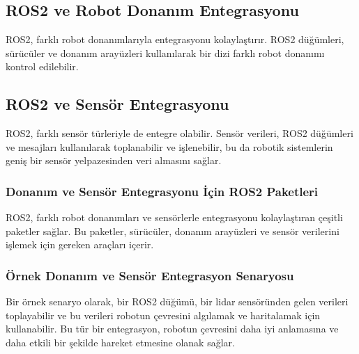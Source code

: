 \subsection{ROS2 ve Robot Donanım Entegrasyonu}
ROS2, farklı robot donanımlarıyla entegrasyonu kolaylaştırır. ROS2 düğümleri, sürücüler ve donanım arayüzleri kullanılarak bir dizi farklı robot donanımı kontrol edilebilir.

\subsection{ROS2 ve Sensör Entegrasyonu}
ROS2, farklı sensör türleriyle de entegre olabilir. Sensör verileri, ROS2 düğümleri ve mesajları kullanılarak toplanabilir ve işlenebilir, bu da robotik sistemlerin geniş bir sensör yelpazesinden veri almasını sağlar.

\subsubsection{Donanım ve Sensör Entegrasyonu İçin ROS2 Paketleri}
ROS2, farklı robot donanımları ve sensörlerle entegrasyonu kolaylaştıran çeşitli paketler sağlar. Bu paketler, sürücüler, donanım arayüzleri ve sensör verilerini işlemek için gereken araçları içerir.

\subsubsection{Örnek Donanım ve Sensör Entegrasyon Senaryosu}
Bir örnek senaryo olarak, bir ROS2 düğümü, bir lidar sensöründen gelen verileri toplayabilir ve bu verileri robotun çevresini algılamak ve haritalamak için kullanabilir. Bu tür bir entegrasyon, robotun çevresini daha iyi anlamasına ve daha etkili bir şekilde hareket etmesine olanak sağlar.